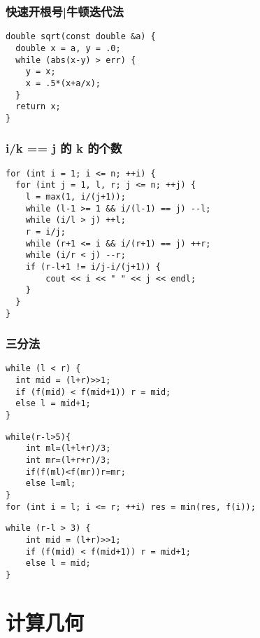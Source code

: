 \documentclass[UTF8]{ctexart}
\begin{document}
{{{{{{\section{快速开根号|牛顿迭代法 }
{\setmainfont{Consolas}
\begin{lstlisting}
double sqrt(const double &a) {
  double x = a, y = .0;
  while (abs(x-y) > err) {
    y = x;
    x = .5*(x+a/x);
  }
  return x;
}
\end{lstlisting}

\section{i/k == j 的 k 的个数 }
{\setmainfont{Consolas}
\begin{lstlisting}
for (int i = 1; i <= n; ++i) {
  for (int j = 1, l, r; j <= n; ++j) {
    l = max(1, i/(j+1));
    while (l-1 >= 1 && i/(l-1) == j) --l;
    while (i/l > j) ++l;
    r = i/j;
    while (r+1 <= i && i/(r+1) == j) ++r;
    while (i/r < j) --r;
    if (r-l+1 != i/j-i/(j+1)) {
        cout << i << " " << j << endl;
    }
  }
}
\end{lstlisting}

\section{三分法 }
{\setmainfont{Consolas}
\begin{lstlisting}
while (l < r) {
  int mid = (l+r)>>1;
  if (f(mid) < f(mid+1)) r = mid;
  else l = mid+1;
}
\end{lstlisting}
{\setmainfont{Consolas}
\begin{lstlisting}
while(r-l>5){
	int ml=(l+l+r)/3;
	int mr=(l+r+r)/3;
	if(f(ml)<f(mr))r=mr;
	else l=ml;
}
for (int i = l; i <= r; ++i) res = min(res, f(i));
\end{lstlisting}
{\setmainfont{Consolas}
\begin{lstlisting}
while (r-l > 3) {
    int mid = (l+r)>>1;
    if (f(mid) < f(mid+1)) r = mid+1;
    else l = mid;
}
\end{lstlisting}


\part{计算几何}
}}}}}}}}}}}
\end{document}
